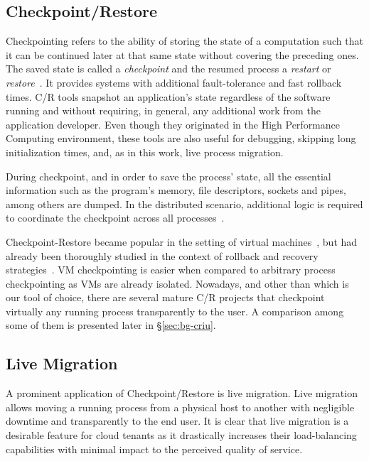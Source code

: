 \subsection{Checkpoint/Restore}

Checkpointing refers to the ability of storing the state of a computation such that it can be continued later at that same state without covering the preceding ones.
The saved state is called a \textit{checkpoint} and the resumed process a \textit{restart} or \textit{restore}~\cite{Schulz2011}.
It provides systems with additional fault-tolerance and fast rollback times.
C/R tools snapshot an application's state regardless of the software running and without requiring, in general, any additional work from the application developer.
Even though they originated in the High Performance Computing environment, these tools are also useful for debugging, skipping long initialization times, and, as in this work, live process migration.

During checkpoint, and in order to save the process' state, all the essential information such as the program's memory, file descriptors, sockets and pipes, among others are dumped.
In the distributed scenario, additional logic is required to coordinate the checkpoint across all processes~\cite{Raynal2013}.

Checkpoint-Restore became popular in the setting of virtual machines~\cite{Clark2005}, but had already been thoroughly studied in the context of rollback and recovery strategies~\cite{Elnozahy2002}.
VM checkpointing is easier when compared to arbitrary process checkpointing as VMs are already isolated.
Nowadays, and other than \criu which is our tool of choice, there are several mature C/R projects that checkpoint virtually any running process transparently to the user.
A comparison among some of them is presented later in \S\ref{sec:bg-criu}.

\subsection{Live Migration}

A prominent application of Checkpoint/Restore is live migration.
Live migration allows moving a running process from a physical host to another with negligible downtime and transparently to the end user.
It is clear that live migration is a desirable feature for cloud tenants as it drastically increases their load-balancing capabilities with minimal impact to the perceived quality of service.

